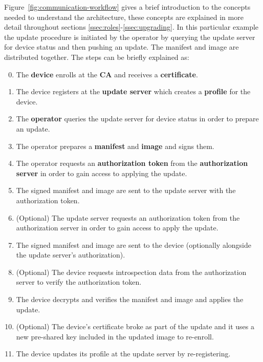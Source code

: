 \documentclass[0-thesis.tex]{subfiles}
\begin{document}
Figure~\ref{fig:communication-workflow} gives a brief introduction to the concepts needed
to understand the architecture, these concepts are explained in more detail throughout
sections \ref{ssec:roles}-\ref{ssec:upgrading}. In this particular example the update
procedure is initiated by the operator by querying the update server for device status and
then pushing an update. The manifest and image are distributed together. The steps can be
briefly explained as:

\begin{enumerate}
    \setcounter{enumi}{-1}
    \item The \textbf{device} enrolls at the \textbf{CA} and receives a
            \textbf{certificate}.
    \item The device registers at the \textbf{update server} which creates a \textbf{profile}
            for the device.
    \item The \textbf{operator} queries the update server for device status in order to
            prepare an update.
    \item The operator prepares a \textbf{manifest} and \textbf{image} and signs them.
    \item The operator requests an \textbf{authorization token} from the
            \textbf{authorization server} in order to gain access to applying the update.
    \item The signed manifest and image are sent to the update server with the
            authorization token.
    \item (Optional) The update server requests an authorization token from the
            authorization server in order to gain access to apply the update.
    \item The signed manifest and image are sent to the device (optionally alongside the
            update server's authorization).
    \item (Optional) The device requests introspection data from the authorization server
            to verify the authorization token.
    \item The device decrypts and verifies the manifest and image and applies the update.
    \item (Optional) The device's certificate broke as part of the update and it uses a
            new pre-shared key included in the updated image to re-enroll.
    \item The device updates its profile at the update server by re-registering.
\end{enumerate}
\end{document}
